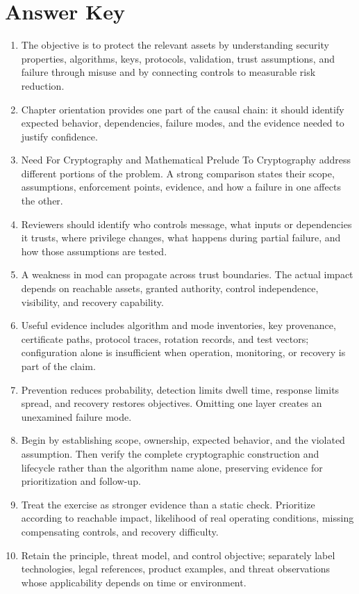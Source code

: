 \documentclass[11pt,letterpaper]{article}
\begin{document}
\section*{Answer Key}
\begin{enumerate}
\item The objective is to protect the relevant assets by understanding security properties, algorithms, keys, protocols, validation, trust assumptions, and failure through misuse and by connecting controls to measurable risk reduction.
\item Chapter orientation provides one part of the causal chain: it should identify expected behavior, dependencies, failure modes, and the evidence needed to justify confidence.
\item Need For Cryptography and Mathematical Prelude To Cryptography address different portions of the problem. A strong comparison states their scope, assumptions, enforcement points, evidence, and how a failure in one affects the other.
\item Reviewers should identify who controls message, what inputs or dependencies it trusts, where privilege changes, what happens during partial failure, and how those assumptions are tested.
\item A weakness in mod can propagate across trust boundaries. The actual impact depends on reachable assets, granted authority, control independence, visibility, and recovery capability.
\item Useful evidence includes algorithm and mode inventories, key provenance, certificate paths, protocol traces, rotation records, and test vectors; configuration alone is insufficient when operation, monitoring, or recovery is part of the claim.
\item Prevention reduces probability, detection limits dwell time, response limits spread, and recovery restores objectives. Omitting one layer creates an unexamined failure mode.
\item Begin by establishing scope, ownership, expected behavior, and the violated assumption. Then verify the complete cryptographic construction and lifecycle rather than the algorithm name alone, preserving evidence for prioritization and follow-up.
\item Treat the exercise as stronger evidence than a static check. Prioritize according to reachable impact, likelihood of real operating conditions, missing compensating controls, and recovery difficulty.
\item Retain the principle, threat model, and control objective; separately label technologies, legal references, product examples, and threat observations whose applicability depends on time or environment.
\end{enumerate}
\end{document}
